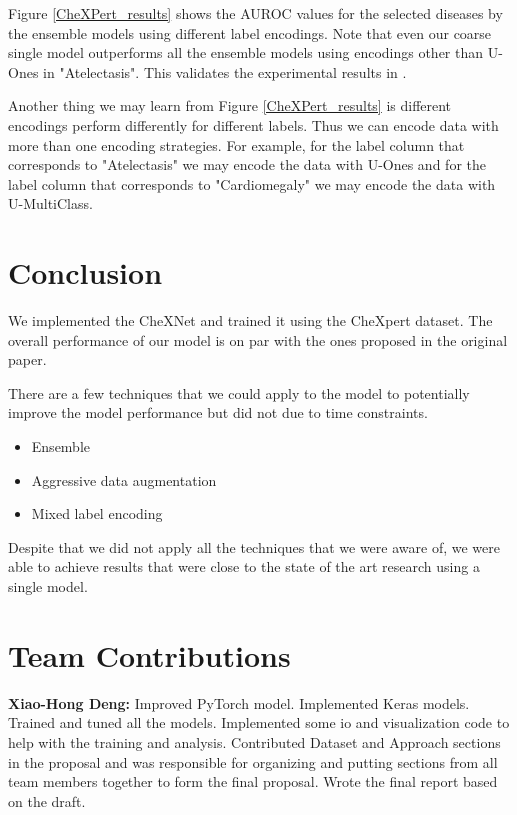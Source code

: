 \documentclass{amia}
\begin{document}
Figure \ref{CheXPert_results} shows the AUROC values for the selected diseases by the ensemble models using different label encodings. Note that even our coarse single model outperforms all the ensemble models using encodings other than U-Ones in "Atelectasis". This validates the experimental results in {\color{cyan}\cite{irvin}}.

Another thing we may learn from Figure \ref{CheXPert_results} is different encodings perform differently for different labels. Thus we can encode data with more than one encoding strategies. For example, for the label column that corresponds to "Atelectasis" we may encode the data with U-Ones and for the label column that corresponds to "Cardiomegaly" we may encode the data with U-MultiClass.

\section{Conclusion}

We implemented the CheXNet and trained it using the CheXpert dataset. The overall performance of our model is on par with the ones proposed in the original paper.

There are a few techniques that we could apply to the model to potentially improve the model performance but did not due to time constraints.
\begin{itemize}
	\item Ensemble
	\item Aggressive data augmentation
	\item Mixed label encoding
\end{itemize}

Despite that we did not apply all the techniques that we were aware of, we were able to achieve results that were close to the state of the art research using a single model.

\section{Team Contributions}

\textbf{Xiao-Hong Deng:} Improved PyTorch model. Implemented Keras models. Trained and tuned all the models. Implemented some io and visualization code to help with the training and analysis. Contributed Dataset and Approach sections in the proposal and was responsible for organizing and putting sections from all team members together to form the final proposal. Wrote the final report based on the draft.
\end{document}
